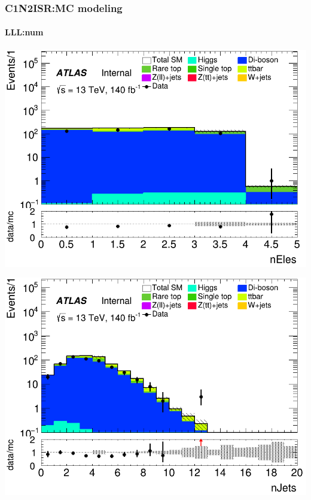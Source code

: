 \documentclass[usenames,dvipsnames]{beamer}
\begin{document}
\begin{frame}
\frametitle{C1N2ISR:MC modeling}
\framesubtitle{LLL:\quad num}
    \begin{minipage}{0.32\textwidth}
        \centering
        \includegraphics[width=\textwidth]{graphics/LLL_met/LLL_met_nEles.png}
    \end{minipage}
    \hfill
    \begin{minipage}{0.32\textwidth}
        \centering
        \includegraphics[width=\textwidth]{graphics/LLL_met/LLL_met_nJets.png}
    \end{minipage}
    \hfill
    \begin{minipage}{0.32\textwidth}
        \centering

\end{minipage}
\end{frame}
\end{document}
